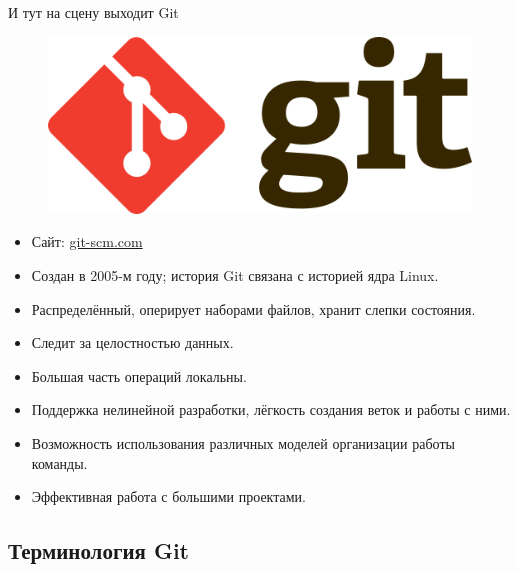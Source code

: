 \documentclass[presentation]{beamer}
\begin{document}
\begin{frame}{И тут на сцену выходит Git}
  \begin{figure}[htb]
    \centering \includegraphics[width=.6\textheight]{Git-logo}
  \end{figure}
  \vspace{-5pt}
  \begin{itemize}
  \item Сайт: \url{git-scm.com}
  \item Создан в 2005-м году; история Git связана с историей ядра Linux.
  \item Распределённый, оперирует наборами файлов, хранит слепки
    состояния.
  \item Следит за целостностью данных.
  \item Большая часть операций локальны.
  \item Поддержка нелинейной разработки, лёгкость создания веток и
    работы с ними.
  \item Возможность использования различных моделей организации работы
    команды.
  \item Эффективная работа с большими проектами.
  \end{itemize}
\end{frame}



\subsection{Терминология Git}
\end{document}
